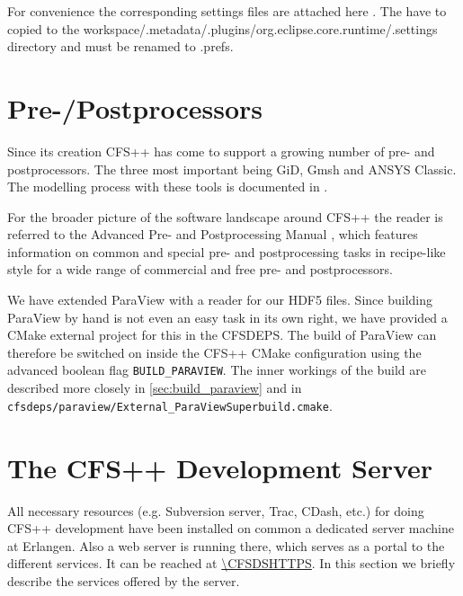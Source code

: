 For   convenience  the   corresponding  settings   files  are   attached  here
. The
have               to                copied               to               the
workspace/.metadata/.plugins/org.eclipse.core.runtime/.settings  directory and
must be renamed to \*.prefs.


\section{Pre-/Postprocessors}
\label{sec:obtaining_prepostprocs}

Since its  creation CFS++  has come to  support a growing  number of  pre- and
postprocessors.  The three  most important being GiD, Gmsh  and ANSYS Classic.
The modelling process with these tools is documented in \cite{Simkovics2010}.

For the broader  picture of the software landscape around  CFS++ the reader is
referred    to     the    Advanced    Pre-     and    Postprocessing    Manual
\cite{CFSAdvPrePostManual}, which  features information on  common and special
pre-  and  postprocessing tasks  in  recipe-like style  for  a  wide range  of
commercial and free pre- and postprocessors.

We have  extended ParaView with a  reader for our HDF5  files.  Since building
ParaView by hand is not even an easy task in its own right, we have provided a
CMake external  project for  this in  the CFSDEPS. The  build of  ParaView can
therefore  be switched  on  inside  the CFS++  CMake  configuration using  the
advanced boolean flag  {\tt BUILD\_PARAVIEW}. The inner workings  of the build
are   described  more   closely  in   \ref{sec:build_paraview}  and   in  {\tt
  cfsdeps/paraview/External\_ParaViewSuperbuild.cmake}.

\section{The CFS++  Development Server}

All necessary resources (e.g. Subversion  server, Trac, CDash, etc.) for doing
CFS++ development have been installed on  common a dedicated server machine at
Erlangen.  Also a web server is running there, which serves as a portal to the
different services.  It  can be reached at \url{\CFSDSHTTPS}.  In this section
we briefly describe the services offered by the server.

